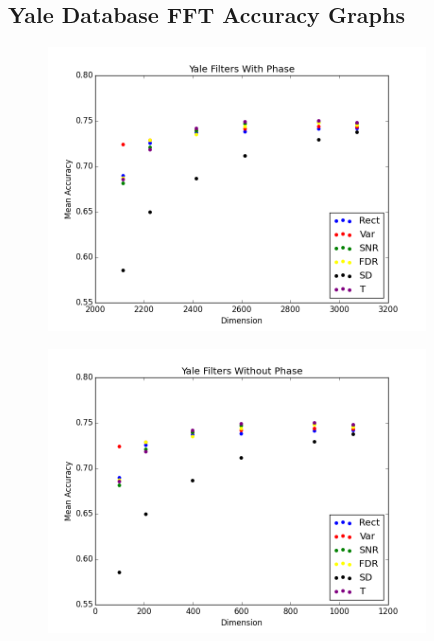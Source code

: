 \documentclass[12pt, letterpaper]{article}
\begin{document}
\subsection{Yale Database FFT Accuracy Graphs}

\begin{center}
	\begin{figure}[H]
		\centering
		\includegraphics[width=10cm, keepaspectratio]{fftAcc/y_filters_phase}
		\label{fig:gfyp}
	\end{figure}
\end{center}

\begin{center}
	\begin{figure}[H]
		\centering
		\includegraphics[width=10cm, keepaspectratio]{fftAcc/y_filters_nophase}
		\label{fig:gfyop}
	\end{figure}
\end{center}
\end{document}

